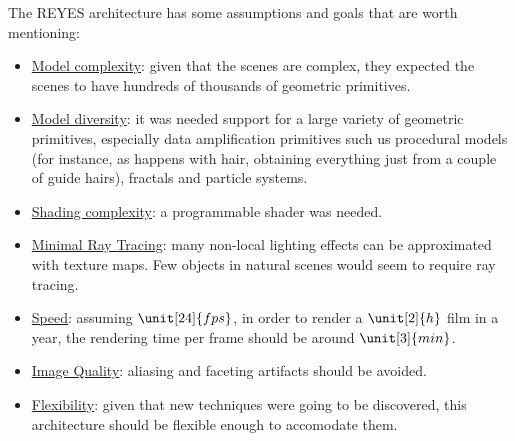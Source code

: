 The REYES architecture has some assumptions and goals that are worth mentioning:
\begin{itemize}
    \item \ul{Model complexity}: given that the scenes are complex, they expected the scenes to have hundreds of thousands of geometric primitives.
    \item \ul{Model diversity}: it was needed support for a large variety of geometric primitives, especially data amplification primitives such us procedural models (for instance, as happens with hair, obtaining everything just from a couple of guide hairs), fractals and particle systems.
    \item \ul{Shading complexity}: a programmable shader was needed.
    \item \ul{Minimal Ray Tracing}: many non-local lighting effects can be approximated with texture maps. Few objects in natural scenes would seem to require ray tracing.
    \item \ul{Speed}: assuming $\unit[24]{fps}$, in order to render a $\unit[2]{h}$ film in a year, the rendering time per frame should be around $\unit[3]{min}$.
    \item \ul{Image Quality}: aliasing and faceting artifacts should be avoided.
    \item \ul{Flexibility}: given that new techniques were going to be discovered, this architecture should be flexible enough to accomodate them.
\end{itemize}

